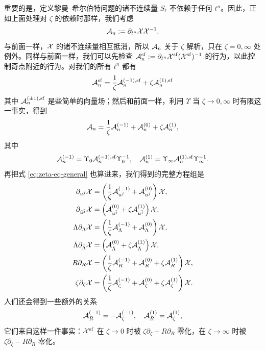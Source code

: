 重要的是，定义黎曼--希尔伯特问题的诸不连续量 $S_\ell$ 不依赖于任何 $t^n$。因此，正如上面处理对 $\zeta$ 的依赖时那样，我们考虑
\begin{equation}
\mathcal{A}_n := \partial_{t^n} \mathcal{X} \mathcal{X}^{-1}.
\end{equation}
与前面一样，$\mathcal{X}$ 的诸不连续量相互抵消，所以 $\mathcal{A}_n$ 关于 $\zeta$ 解析，只在 $\zeta = 0, \infty$ 处例外。同样与前面一样，我们可以先检查 $\mathcal{A}^{\mathrm{sf}}_n := \partial_{t^n} \mathcal{X}^{\mathrm{sf}} (\mathcal{X}^{\mathrm{sf}})^{-1}$ 的行为，以此控制奇点附近的行为。对我们的所有 $t^n$ 都有
\begin{equation}
\mathcal{A}^{\mathrm{sf}}_n = \frac{1}{\zeta} \mathcal{A}^{(-1),{\mathrm{sf}}}_n + \zeta \mathcal{A}^{(1),{\mathrm{sf}}}_n
\end{equation}
其中 $\mathcal{A}^{(\pm 1),{\mathrm{sf}}}_n$ 是些简单的向量场；然后和前面一样，利用 $\Upsilon$ 当 $\zeta \to 0,\infty$ 时有限这一事实，得到
\begin{equation}
\mathcal{A}_n = \frac{1}{\zeta} \mathcal{A}_n^{(-1)} + \mathcal{A}_n^{(0)} + \zeta \mathcal{A}_n^{(1)},
\end{equation}
其中
\begin{equation}
\mathcal{A}_n^{(-1)} = \Upsilon_0 \mathcal{A}_n^{(-1),{\mathrm{sf}}} \Upsilon_0^{-1}, \quad \mathcal{A}_n^{(1)} = \Upsilon_\infty \mathcal{A}_n^{(1),{\mathrm{sf}}} \Upsilon_\infty^{-1}.
\end{equation}
再把式 \eqref{eq:zeta-eq-general} 也算进来，我们得到的完整方程组是
\begin{align}
\partial_{u^j} \mathcal{X} &= \left( \frac{1}{\zeta} {\mathcal{A}^{(-1)}_{u^j}} + \mathcal{A}^{(0)}_{u^j} \right) \mathcal{X}, \label{eq:conn-holomorphy-1} \\
\partial_{\bar{u}^{\bar j}} \mathcal{X} &= \left( {\mathcal{A}}^{(0)}_{\bar{u}^{\bar j}} + \zeta {\mathcal{A}}^{(1)}_{\bar{u}^{\bar j}} \right) \mathcal{X}, \label{eq:conn-holomorphy-2} \\
\Lambda \partial_\Lambda \mathcal{X} &= \left( \frac{1}{\zeta} {\mathcal{A}_\Lambda^{(-1)}} + \mathcal{A}_\Lambda^{(0)} \right) \mathcal{X}, \label{eq:lambda-equation} \\
\bar\Lambda \partial_{\bar\Lambda} \mathcal{X} &= \left( \mathcal{A}_{\bar \Lambda}^{(0)} + \zeta \mathcal{A}_{\bar \Lambda}^{(1)} \right) \mathcal{X}, \label{eq:lambda-bar-equation} \\
R \partial_R \mathcal{X} &= \left( \frac{1}{\zeta} {\mathcal{A}_R^{(-1)}} + \mathcal{A}_R^{(0)} + \zeta \mathcal{A}_R^{(1)} \right) \mathcal{X}, \label{eq:R-equation} \\
\zeta \partial_\zeta \mathcal{X} &= \left( \frac{1}{\zeta} {\mathcal{A}_\zeta^{(-1)}} + \mathcal{A}_\zeta^{(0)} + \zeta \mathcal{A}_\zeta^{(1)} \right) \mathcal{X}. \label{eq:zeta-equation}
\end{align}
人们还会得到一些额外的关系
\begin{equation} \label{eq:M-relations}
\mathcal{A}_R^{(-1)} = - \mathcal{A}_\zeta^{(-1)}, \quad \mathcal{A}_R^{(1)} = \mathcal{A}_\zeta^{(1)},
\end{equation}
它们来自这样一件事实：$\mathcal{X}^{\mathrm{sf}}$ 在 $\zeta \to 0$ 时被 $\zeta \partial_\zeta + R \partial_R$ 零化，在 $\zeta \to \infty$ 时被 $\zeta \partial_\zeta - R \partial_R$ 零化。

